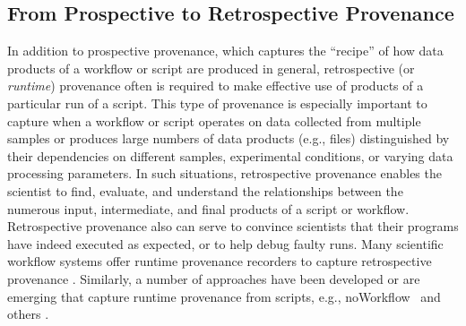 \documentclass[nocopyrightspace]{sigplanconf}
\newcommand{\NW}{\textsf{noWorkflow}}
\begin{document}
\subsection*{From Prospective to Retrospective Provenance} 
In addition to prospective provenance, which captures the ``recipe''
of how data products of a workflow or script are produced in general,
retrospective (or \emph{runtime}) provenance often is required to 
make effective use of products of a particular
run of a script.  This type of provenance is especially important to capture
when a workflow or script operates on data collected from multiple samples
or produces large numbers of data products (e.g., files)
distinguished by their dependencies on different samples,
experimental conditions, or varying data processing parameters. In such situations,
retrospective provenance enables the scientist to find, evaluate, and understand
the relationships between the numerous input, intermediate, and final products
of a script or workflow.  Retrospective
provenance also can serve to convince scientists that their programs have 
indeed executed as expected, or to help debug faulty runs.  Many scientific workflow
systems offer runtime provenance recorders to capture retrospective
provenance
\cite{altintas2006provenance,davidson2007provenance,bowers2008kepler}. Similarly,
a number of approaches have been developed or are emerging that
capture runtime provenance from scripts, e.g., \NW\
\cite{murta2014nw} and others \cite{gandrud2013reproducible}.
\end{document}
